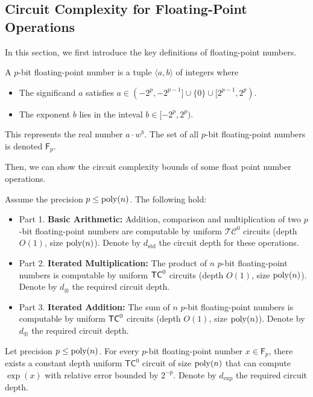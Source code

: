 \subsection{Circuit Complexity for Floating-Point Operations}\label{sec:pre:float}
In this section, we first introduce the key definitions of floating-point numbers.
\begin{definition}
    A $p$-bit floating-point number is a tuple $\langle a,b \rangle$ of integers where
    \begin{itemize}
        \item The significand $a$ satisfies $a \in (-2^p,-2^{p-1}] \cup \{0\} \cup [2^{p-1},2^p)$.
        \item The exponent $b$ lies in the inteval $b\in [-2^p, 2^p)$.
    \end{itemize}
    This represents the real number $a \cdot w^b$. The set of all $p$-bit floating-point numbers is denoted $\mathsf{F}_p$.
\end{definition}


Then, we can show the circuit complexity bounds of some float point number operations.
\begin{lemma}\label{lem:float_operations_TC} 
Assume the precision $p \leq \operatorname{poly}(n)$. The following hold:
\begin{itemize}
    \item Part 1. {\bf Basic Arithmetic:} Addition, comparison and multiplication of two $p$-bit floating-point numbers are computable by uniform $\mathcal{TC}^0$ circuits (depth $O(1)$, size $\operatorname{poly}(n)$). Denote by $d_{\mathrm{std}}$ the circuit depth for these operations.
    
    
    \item Part 2. {\bf Iterated Multiplication:} The product of $n$ $p$-bit floating-point numbers is computable by uniform $\mathsf{TC}^0$ circuits (depth $O(1)$, size $\operatorname{poly}(n)$). Denote by $d_{\otimes}$ the required circuit depth.
    
    \item Part 3. {\bf Iterated Addition:} The sum of $n$ $p$-bit floating-point numbers is computable by uniform $\mathsf{TC}^0$ circuits (depth $O(1)$, size $\operatorname{poly}(n)$). Denote by $d_{\oplus}$ the required circuit depth.
\end{itemize}
\end{lemma}


\begin{lemma}\label{lem:exp}
    Let precision $p \leq \operatorname{poly}(n)$. For every $p$-bit floating-point number $x \in \mathsf{F}_p$, there exists a constant depth uniform $\mathsf{TC}^0$ circuit of size $\operatorname{poly}(n)$ that can compute $\exp(x)$ with relative error bounded by $2^{-p}$. Denote by $d_{\exp}$ the required circuit depth.

\end{lemma}

